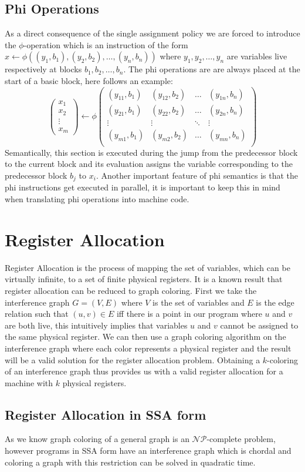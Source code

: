 \subsection{Phi Operations}
As a direct consequence of the single assignment policy we are forced to introduce the $\phi$-operation which is an instruction of the form $x \leftarrow \phi((y_1, b_1), (y_2, b_2), \dots, (y_n, b_n))$ where $y_1, y_2, \dots, y_n$ are variables live respectively at blocks $b_1, b_2, \dots, b_n$.
The phi operations are are always placed at the start of a basic block, here follows an example:
\[
\begin{pmatrix}
    x_1 \\ x_2 \\ \vdots \\ x_m
\end{pmatrix}
\leftarrow \phi
\begin{pmatrix}
    (y_{11}, b_1) & (y_{12}, b_2) & \dots & (y_{1n}, b_n) \\
    (y_{21}, b_1) & (y_{22}, b_2) & \dots & (y_{2n}, b_n) \\
    \vdots & \vdots & \ddots & \vdots \\
    (y_{m1}, b_1) & (y_{m2}, b_2) & \dots & (y_{mn}, b_n) \\
\end{pmatrix}
\]
Semantically, this section is executed during the jump from the predecessor block to the current block and its evaluation assigns the variable corresponding to the predecessor block $b_j$ to $x_i$.
Another important feature of phi semantics is that the phi instructions get executed in parallel, it is important to keep this in mind when translating phi operations into machine code.

\section{Register Allocation}
\label{sec:ra}

Register Allocation is the process of mapping the set of variables, which can be virtually infinite, to a set of finite physical registers. It is a known result that register allocation can be reduced to graph coloring. First we take the interference graph $G = (V, E)$ where $V$ is the set of variables and $E$ is the edge relation such that $(u, v) \in E$ iff there is a point in our program where $u$ and $v$ are both live, this intuitively implies that variables $u$ and $v$ cannot be assigned to the same physical register.
We can then use a graph coloring algorithm on the interference graph where each color represents a physical register and the result will be a valid solution for the register allocation problem.
Obtaining a $k$-coloring of an interference graph thus provides us with a valid register allocation for a machine with $k$ physical registers.

\subsection{Register Allocation in SSA form}
As we know graph coloring of a general graph is an $\mathcal{NP}$-complete problem, however programs in SSA form have an interference graph which is chordal and coloring a graph with this restriction can be solved in quadratic time.
